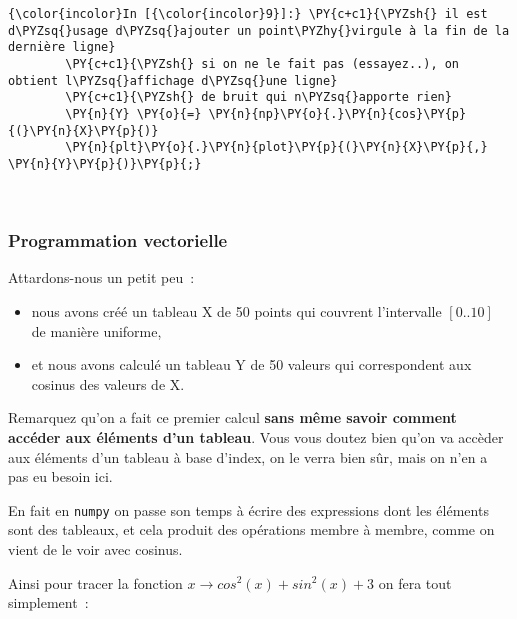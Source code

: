     \begin{Verbatim}[commandchars=\\\{\},frame=single,framerule=0.3mm,rulecolor=\color{cellframecolor}]
{\color{incolor}In [{\color{incolor}9}]:} \PY{c+c1}{\PYZsh{} il est d\PYZsq{}usage d\PYZsq{}ajouter un point\PYZhy{}virgule à la fin de la dernière ligne}
        \PY{c+c1}{\PYZsh{} si on ne le fait pas (essayez..), on obtient l\PYZsq{}affichage d\PYZsq{}une ligne}
        \PY{c+c1}{\PYZsh{} de bruit qui n\PYZsq{}apporte rien}
        \PY{n}{Y} \PY{o}{=} \PY{n}{np}\PY{o}{.}\PY{n}{cos}\PY{p}{(}\PY{n}{X}\PY{p}{)}
        \PY{n}{plt}\PY{o}{.}\PY{n}{plot}\PY{p}{(}\PY{n}{X}\PY{p}{,} \PY{n}{Y}\PY{p}{)}\PY{p}{;}
\end{Verbatim}


    \begin{center}
    \end{center}
    { \hspace*{\fill} \\}
    
    \hypertarget{programmation-vectorielle}{%
\subsubsection{Programmation
vectorielle}\label{programmation-vectorielle}}

    Attardons-nous un petit peu~:

\begin{itemize}
\tightlist
\item
  nous avons créé un tableau X de 50 points qui couvrent l'intervalle
  \([0..10]\) de manière uniforme,
\item
  et nous avons calculé un tableau Y de 50 valeurs qui correspondent aux
  cosinus des valeurs de X.
\end{itemize}

    Remarquez qu'on a fait ce premier calcul \textbf{sans même savoir
comment accéder aux éléments d'un tableau}. Vous vous doutez bien qu'on
va accèder aux éléments d'un tableau à base d'index, on le verra bien
sûr, mais on n'en a pas eu besoin ici.

En fait en \texttt{numpy} on passe son temps à écrire des expressions
dont les éléments sont des tableaux, et cela produit des opérations
membre à membre, comme on vient de le voir avec cosinus.

Ainsi pour tracer la fonction
\(x \longrightarrow cos^2(x) + sin^2(x) + 3\) on fera tout simplement~:

